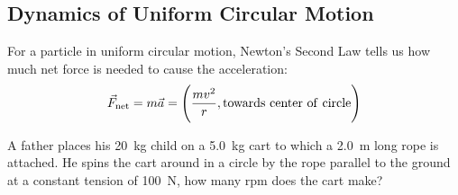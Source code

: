 \subsection{Dynamics of Uniform Circular Motion}

For a particle in uniform circular motion, Newton's Second Law tells us
how much net force is needed to cause the acceleration:
\begin{equation}
    \vec{F}_{\mathrm{net}} = m\vec{a} = \left(\frac{mv^2}{r},\mathrm{towards~center~of~circle}\right)
\end{equation}

\begin{Exercise}[title={Spinning in a Circle}, origin={Knight}]
    A father places his \SI{20}{\kilogram} child on a \SI{5.0}{\kilogram}
    cart to which a \SI{2.0}{\metre} long rope is attached.  He spins
    the cart around in a circle by the rope parallel to the ground at a
    constant tension of \SI{100}{\newton}, how many rpm does the cart
    make?
\end{Exercise}
